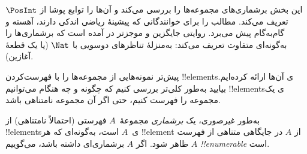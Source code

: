 \documentclass[../../../include/open-logic-section]{subfiles}
\begin{document}


\begin{editorial}
  این بخش برشماری‌های مجموعه‌ها را بررسی می‌کند و آن‌ها را توابع
  پوشا از $\PosInt$ تعریف می‌کند. مطالب را برای خوانندگانی که پیشینهٔ
  ریاضی اندکی دارند، آهسته و گام‌به‌گام پیش می‌برد. روایتی جایگزین و
  موجزتر در  آمده است که برشماری‌ها را به‌گونه‌ای
  متفاوت تعریف می‌کند: به‌منزلهٔ تناظرهای دوسویی با $\Nat$ (یا یک قطعهٔ آغازین).
\end{editorial}

\begin{explain}
پیش‌تر نمونه‌هایی از مجموعه‌ها را با فهرست‌کردن !!{element}sی آن‌ها
ارائه کرده‌ایم. بیایید به‌طور کلی‌تر بررسی کنیم که چگونه و چه هنگام
می‌توانیم !!{element}sی یک مجموعه را فهرست کنیم، حتی اگر آن مجموعه
نامتناهی باشد.
\end{explain}

\begin{defn}
به‌طور غیرصوری، یک \emph{برشماری} مجموعهٔ~$A$ فهرستی (احتمالاً
نامتناهی) از !!{element}sی~$A$ است، به‌گونه‌ای که هر !!{element}
از $A$ در جایگاهی متناهی از فهرست ظاهر شود. اگر $A$ برشماری‌ای داشته
باشد، می‌گوییم $A$ \emph{!!{enumerable}} است.
\end{defn}
\end{document}
